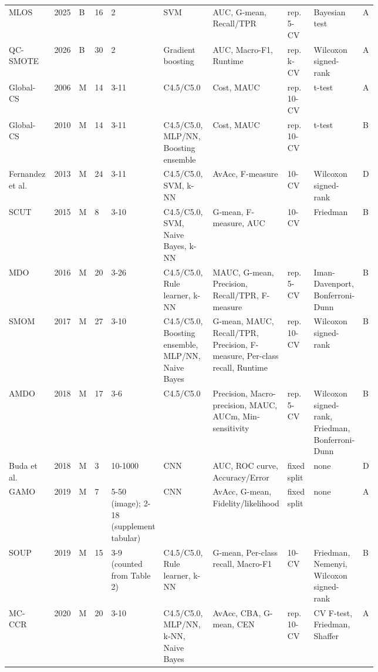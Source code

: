 \begin{longtable}{@{}p{0.13\linewidth}lllp{0.06\linewidth}p{0.15\linewidth}p{0.2\linewidth}p{0.08\linewidth}p{0.11\linewidth}l@{}}
MLOS~\parencite{yan2025mlos} & 2025 & B & 16 & 2 & SVM & AUC, G-mean, Recall/TPR & rep. 5-CV & Bayesian test & A\\
QC-SMOTE~\parencite{upman2026qcsmote} & 2026 & B & 30 & 2 & Gradient boosting & AUC, Macro-F1, Runtime & rep. k-CV & Wilcoxon signed-rank & A\\
Global-CS~\parencite{zhou2006globalcs} & 2006 & M & 14 & 3-11 & C4.5/C5.0 & Cost, MAUC & rep. 10-CV & t-test & A\\
Global-CS~\parencite{zhou2010globalcs} & 2010 & M & 14 & 3-11 & C4.5/C5.0, MLP/NN, Boosting ensemble & Cost, MAUC & rep. 10-CV & t-test & B\\
Fernandez et al.~\parencite{fernandez2013analysing} & 2013 & M & 24 & 3-11 & C4.5/C5.0, SVM, k-NN & AvAcc, F-measure & 10-CV & Wilcoxon signed-rank & D\\
SCUT~\parencite{agrawal2015scut} & 2015 & M & 8 & 3-10 & C4.5/C5.0, SVM, Naive Bayes, k-NN & G-mean, F-measure, AUC & 10-CV & Friedman & B\\
MDO~\parencite{abdi2016mdo} & 2016 & M & 20 & 3-26 & C4.5/C5.0, Rule learner, k-NN & MAUC, G-mean, Precision, Recall/TPR, F-measure & rep. 5-CV & Iman-Davenport, Bonferroni-Dunn & B\\
SMOM~\parencite{zhu2017smom} & 2017 & M & 27 & 3-10 & C4.5/C5.0, Boosting ensemble, MLP/NN, Naive Bayes & G-mean, MAUC, Recall/TPR, Precision, F-measure, Per-class recall, Runtime & rep. 10-CV & Wilcoxon signed-rank & B\\
AMDO~\parencite{yang2018amdo} & 2018 & M & 17 & 3-6 & C4.5/C5.0 & Precision, Macro-precision, MAUC, AUCm, Min-sensitivity & rep. 5-CV & Wilcoxon signed-rank, Friedman, Bonferroni-Dunn & B\\
Buda et al.~\parencite{buda2018systematic} & 2018 & M & 3 & 10-1000 & CNN & AUC, ROC curve, Accuracy/Error & fixed split & none & D\\
GAMO~\parencite{mullick2019gamo} & 2019 & M & 7 & 5-50 (image); 2-18 (supplement tabular) & CNN & AvAcc, G-mean, Fidelity/likelihood & fixed split & none & A\\
SOUP~\parencite{janicka2019soup} & 2019 & M & 15 & 3-9 (counted from Table 2) & C4.5/C5.0, Rule learner, k-NN & G-mean, Per-class recall, Macro-F1 & 10-CV & Friedman, Nemenyi, Wilcoxon signed-rank & B\\
MC-CCR~\parencite{koziarski2020mcccr} & 2020 & M & 20 & 3-10 & C4.5/C5.0, MLP/NN, k-NN, Naive Bayes & AvAcc, CBA, G-mean, CEN & rep. 10-CV & CV F-test, Friedman, Shaffer & A\\

\end{longtable}
